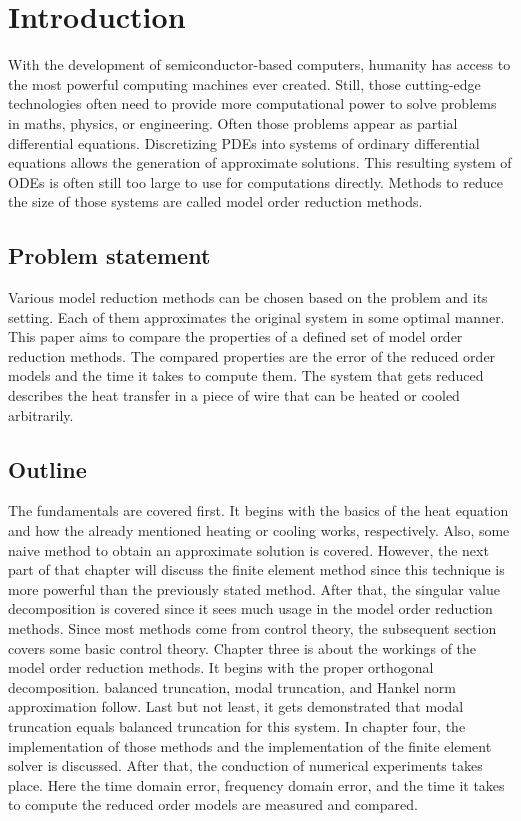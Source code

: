 \chapter{Introduction}
With the development of semiconductor-based computers, humanity has access to the most powerful computing machines ever created. Still, those cutting-edge technologies often need to provide more computational power to solve problems in maths, physics, or engineering. Often those problems appear as partial differential equations. Discretizing PDEs into systems of ordinary differential equations allows the generation of approximate solutions. This resulting system of ODEs is often still too large to use for computations directly. Methods to reduce the size of those systems are called model order reduction methods.

\section{Problem statement}
Various model reduction methods can be chosen based on the problem and its setting. Each of them approximates the original system in some optimal manner. This paper aims to compare the properties of a defined set of model order reduction methods. The compared properties are the error of the reduced order models and the time it takes to compute them. The system that gets reduced describes the heat transfer in a piece of wire that can be heated or cooled arbitrarily.

\section{Outline}
The fundamentals are covered first. It begins with the basics of the heat equation and how the already mentioned heating or cooling works, respectively. Also, some naive method to obtain an approximate solution is covered. However, the next part of that chapter will discuss the finite element method since this technique is more powerful than the previously stated method.
After that, the singular value decomposition is covered since it sees much usage in the model order reduction methods. Since most methods come from control theory, the subsequent section covers some basic control theory. Chapter three is about the workings of the model order reduction methods. It begins with the proper orthogonal decomposition. balanced truncation, modal truncation, and Hankel norm approximation follow.
Last but not least, it gets demonstrated that modal truncation equals balanced truncation for this system. In chapter four, the implementation of those methods and the implementation of the finite element solver is discussed. After that, the conduction of numerical experiments
takes place. Here the time domain error, frequency domain error, and the time it takes to compute the reduced order models are measured and compared.
